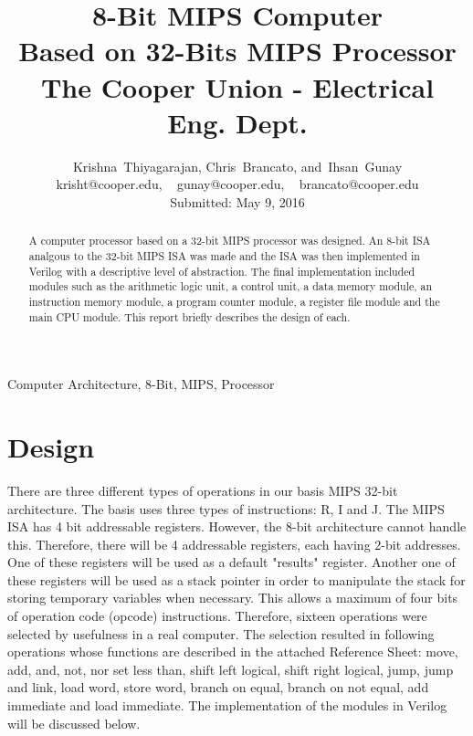 \documentclass[journal]{IEEEtran}
\begin{document}
\title{8-Bit MIPS Computer \\ Based on 32-Bits MIPS Processor \\ The Cooper Union - Electrical Eng.  Dept. }


\author{Krishna~Thiyagarajan, Chris~Brancato, and~Ihsan~Gunay\\ krisht@cooper.edu, ~ gunay@cooper.edu, ~ brancato@cooper.edu \\ Submitted: May 9, 2016}
\maketitle

\begin{abstract}
    A computer processor based on a 32-bit MIPS processor was designed. An 8-bit ISA analgous to the 32-bit MIPS ISA was made and the ISA was then implemented in Verilog with a descriptive level of abstraction. The final implementation included modules such as the arithmetic logic unit, a control unit, a data memory module, an instruction memory module, a program counter module, a register file module and the main CPU module. This report briefly describes the design of each.
\end{abstract}

\begin{IEEEkeywords}
Computer Architecture, 8-Bit, MIPS, Processor
\end{IEEEkeywords}



\section{Design}
There are three different types of operations in our basis MIPS 32-bit architecture. The basis uses three types of instructions: R, I and J. The MIPS ISA has 4 bit addressable registers. However, the 8-bit architecture cannot handle this. Therefore, there will be 4 addressable registers, each having 2-bit addresses. One of these registers will be used as a default "results" register. Another one of these registers will be used as a stack pointer in order to manipulate the stack for storing temporary variables when necessary. This allows a maximum of four bits of operation code (opcode) instructions. Therefore, sixteen operations were selected by usefulness in a real computer. The selection resulted in following operations whose functions are described in the attached Reference Sheet: move, add, and, not, nor set less than, shift left logical, shift right logical, jump, jump and link, load word, store word, branch on equal, branch on not equal, add immediate and load immediate. The implementation of the modules in Verilog will be discussed below.
\end{document}
